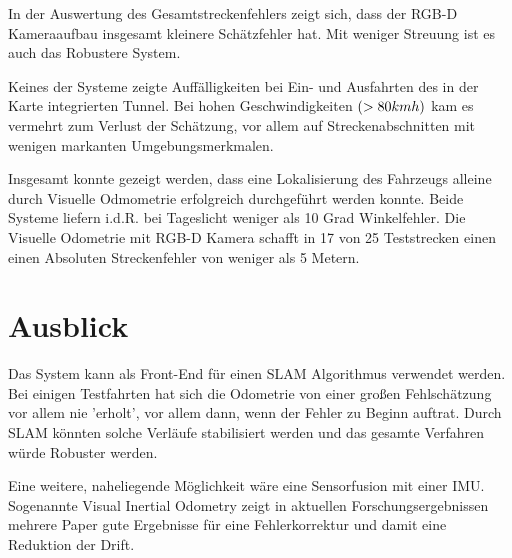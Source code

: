 In der Auswertung des Gesamtstreckenfehlers zeigt sich, dass der RGB-D Kameraaufbau insgesamt kleinere Schätzfehler hat. Mit weniger Streuung ist es auch das Robustere System.    
\newline

Keines der Systeme zeigte Auffälligkeiten bei Ein- und Ausfahrten des in der Karte integrierten Tunnel. Bei hohen Geschwindigkeiten $(> 80 km\/h)$ kam es vermehrt zum Verlust der Schätzung, vor allem auf Streckenabschnitten mit wenigen markanten Umgebungsmerkmalen.  
\newline

Insgesamt konnte gezeigt werden, dass eine Lokalisierung des Fahrzeugs alleine durch Visuelle Odmometrie erfolgreich durchgeführt werden konnte. Beide Systeme liefern i.d.R. bei Tageslicht weniger als 10 Grad Winkelfehler. Die Visuelle Odometrie mit RGB-D Kamera schafft in 17 von 25 Teststrecken einen einen Absoluten Streckenfehler von weniger als 5 Metern. 

\section{Ausblick}
Das System kann als Front-End für einen SLAM Algorithmus verwendet werden. Bei einigen Testfahrten hat sich die Odometrie von einer gro{\ss}en Fehlschätzung vor allem nie 'erholt', vor allem dann, wenn der Fehler zu Beginn auftrat. Durch SLAM könnten solche Verläufe stabilisiert werden und das gesamte Verfahren würde Robuster werden. 
\newline

Eine weitere, naheliegende Möglichkeit wäre eine Sensorfusion mit einer IMU. Sogenannte Visual Inertial Odometry zeigt in aktuellen Forschungsergebnissen mehrere Paper gute Ergebnisse für eine Fehlerkorrektur und damit eine Reduktion der Drift.